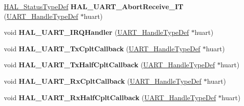 \begin{DoxyCompactItemize}
\item 
\mbox{\label{group___u_a_r_t___exported___functions___group2_gaad7bc5748b849abc29d18b2ddd02876f}} 
\hyperlink{stm32f1xx__hal__def_8h_a63c0679d1cb8b8c684fbb0632743478f}{H\+A\+L\+\_\+\+Status\+Type\+Def} {\bfseries H\+A\+L\+\_\+\+U\+A\+R\+T\+\_\+\+Abort\+Receive\+\_\+\+IT} (\hyperlink{struct_u_a_r_t___handle_type_def}{U\+A\+R\+T\+\_\+\+Handle\+Type\+Def} $\ast$huart)
\item 
\mbox{\label{group___u_a_r_t___exported___functions___group2_gaad01472c507ceee3c5f2274c775ff3bf}} 
void {\bfseries H\+A\+L\+\_\+\+U\+A\+R\+T\+\_\+\+I\+R\+Q\+Handler} (\hyperlink{struct_u_a_r_t___handle_type_def}{U\+A\+R\+T\+\_\+\+Handle\+Type\+Def} $\ast$huart)
\item 
\mbox{\label{group___u_a_r_t___exported___functions___group2_gabcdf9b59049eccbc87d54042f9235b1a}} 
void {\bfseries H\+A\+L\+\_\+\+U\+A\+R\+T\+\_\+\+Tx\+Cplt\+Callback} (\hyperlink{struct_u_a_r_t___handle_type_def}{U\+A\+R\+T\+\_\+\+Handle\+Type\+Def} $\ast$huart)
\item 
\mbox{\label{group___u_a_r_t___exported___functions___group2_ga49b287e7de94cd0a38d333629298f7c4}} 
void {\bfseries H\+A\+L\+\_\+\+U\+A\+R\+T\+\_\+\+Tx\+Half\+Cplt\+Callback} (\hyperlink{struct_u_a_r_t___handle_type_def}{U\+A\+R\+T\+\_\+\+Handle\+Type\+Def} $\ast$huart)
\item 
\mbox{\label{group___u_a_r_t___exported___functions___group2_gae494a9643f29b87d6d81e5264e60e57b}} 
void {\bfseries H\+A\+L\+\_\+\+U\+A\+R\+T\+\_\+\+Rx\+Cplt\+Callback} (\hyperlink{struct_u_a_r_t___handle_type_def}{U\+A\+R\+T\+\_\+\+Handle\+Type\+Def} $\ast$huart)
\item 
\mbox{\label{group___u_a_r_t___exported___functions___group2_ga1884970cc493d8efba5aec28c0d526e7}} 
void {\bfseries H\+A\+L\+\_\+\+U\+A\+R\+T\+\_\+\+Rx\+Half\+Cplt\+Callback} (\hyperlink{struct_u_a_r_t___handle_type_def}{U\+A\+R\+T\+\_\+\+Handle\+Type\+Def} $\ast$huart)
\item 

\end{DoxyCompactItemize}
